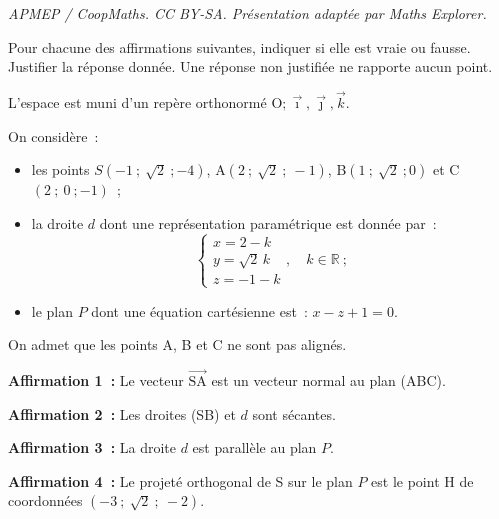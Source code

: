 \documentclass[10pt]{article}
\providecommand{\R}{\mathbb{R}}
\providecommand{\Oijk}{\(\mathrm{O};\vec{\imath},\vec{\jmath},\vec{k}\)}
\begin{document}
\noindent\textit{APMEP / CoopMaths. CC BY-SA. Présentation adaptée par Maths Explorer.}\par\medskip
Pour chacune des affirmations suivantes, indiquer si elle est vraie ou fausse. Justifier la réponse donnée. Une réponse non justifiée ne rapporte aucun point.

L'espace est muni d'un repère orthonormé \Oijk.

On considère~:

\begin{itemize}[noitemsep]
\item les points $S(-1~;~\sqrt{2}~;-4)$, A$(2~;~\sqrt{2}~;~-1)$, B$(1~;~\sqrt{2}~;0)$ et C$(2~;~0~;-1)$~;
\item la droite $d$ dont une représentation paramétrique est donnée par~:
\[
\begin{cases}
x = 2-k\\
y = \sqrt{2}\,k\\
z = -1-k
\end{cases}, \quad k \in \R~;
\]
\item le plan $P$ dont une équation cartésienne est~: $x - z + 1 = 0$.
\end{itemize}

On admet que les points A, B et C ne sont pas alignés.

\textbf{Affirmation 1~:} Le vecteur $\overrightarrow{\text{SA}}$ est un vecteur normal au plan (ABC).

\textbf{Affirmation 2~:} Les droites (SB) et $d$ sont sécantes.

\textbf{Affirmation 3~:} La droite $d$ est parallèle au plan $P$.

\textbf{Affirmation 4~:} Le projeté orthogonal de S sur le plan $P$ est le point H de coordonnées $(-3~;~\sqrt{2}~;~-2)$.
\end{document}
